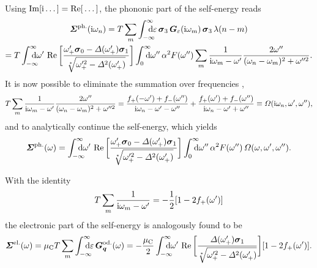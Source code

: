 Using $\operatorname{Im}[\mathrm i \dots] = \operatorname{Re}[\,\dots]$, the phononic part of the self-energy reads
%
\begin{multline*}
    \vec \Sigma \super{ph.} (\I \omega_n)
    = T \sum_m \int \from{-\infty} \till \infty \D \epsilon \,
    \vec \sigma_3 \, \vec G_\epsilon(\I \omega_m) \, \vec \sigma_3 \,
    \lambda(n - m)
    \\
    = T \int \from{-\infty} \till \infty \D \omega' \, \Re \bigg[ \frac
        {\omega'_+ \vec \sigma_0 - \Delta(\omega'_+) \vec \sigma_1}
        {\sqrt[*]{\omega'^2_+ - \Delta^2(\omega'_+)}}
    \bigg]
    \int \from 0 \till \infty \D \omega'' \, \alpha^2 F(\omega'')
    \sum_m \frac 1 {\I \omega_m - \omega'}
    \frac{2 \omega''}{(\omega_n - \omega_m)^2 + \omega''^2}.
\end{multline*}
%
It is now possible to eliminate the summation over  frequencies
\cite[Eqs.~3.40, 3.41]{AllenMitrovic82},
%
\begin{equation*}
    T \sum_m \frac 1 {\mathrm i \omega_m - \omega'}
    \frac{2 \omega''}{(\omega_n - \omega_m)^2 + \omega''^2}
    = \frac{f_+(-\omega') + f_-(\omega'')}{\mathrm i \omega_n - \omega' - \omega''}
    + \frac{f_+( \omega') + f_-(\omega'')}{\mathrm i \omega_n - \omega' + \omega''}
    \equiv \varOmega(\mathrm i \omega_n, \omega', \omega''),
\end{equation*}
%
and to analytically continue the self-energy, which yields
%
\begin{equation*}
    \vec \Sigma \super{ph.} (\omega) =
    \int \from{-\infty} \till \infty \D \omega' \,
    \Re \bigg[ \frac
        {\omega'_+ \vec \sigma_0 - \Delta(\omega'_+) \vec \sigma_1}
        {\sqrt[*]{\omega'^2_+ - \Delta^2(\omega'_+)}}
    \bigg]
    \int \from 0 \till \infty \D \omega'' \, \alpha^2 F(\omega'') \,
    \Omega(\omega, \omega', \omega'').
\end{equation*}

With the identity \cite[Eq.~12.4]{AllenMitrovic82}
%
\begin{equation} \label{Matsubara sum}
    T \sum_m \frac 1 {\mathrm i \omega_m - \omega'} = -\frac 1 2 [1 - 2 f_+(\omega')]
\end{equation}
%
the electronic part of the self-energy is analogously found to be
%
\begin{align*}
    \vec \Sigma \super{el.} (\omega)
    = \mu \sub C T \sum_{m} \int \from{-\infty} \till \infty \D \epsilon \,
    \vec G_{\vec q} \super{od.} (\omega)
    = -\frac {\mu \sub C} 2 \int \from{-\infty} \till \infty \D \omega' \,
    \Re \bigg[ \frac
        {\Delta(\omega'_+) \vec \sigma_1}
        {\sqrt[*]{\omega'^2_+ - \Delta^2(\omega'_+)}}
    \bigg] [1 - 2 f_+(\omega')].
\end{align*}

